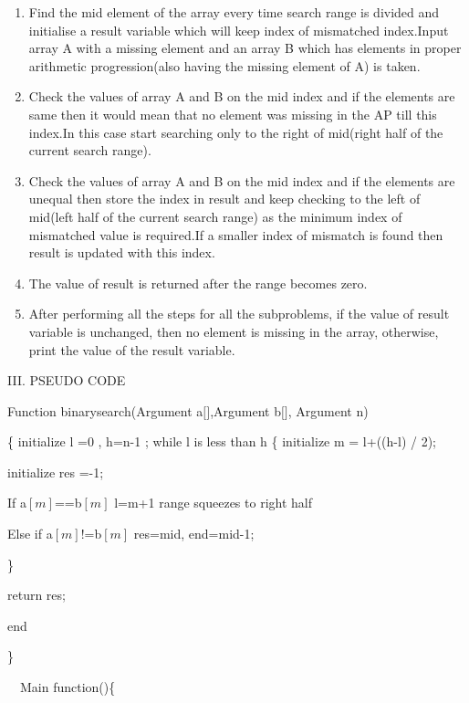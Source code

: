 \documentclass[12pt,a4paper]{article}
\begin{document}
\begin{multicols}{2}
\begin{enumerate}
\item Find the mid element of the array every time search range is divided and initialise a result variable which will keep index of mismatched index.Input array A with a missing element and an array B which has elements in proper arithmetic progression(also having the missing element of A) is taken.
\item Check the values of array A and B on the mid index and if the elements are same then it would mean that no element was missing in the AP till this index.In this case start searching only to the right of mid(right half of the current search range).
\item Check the values of array A and B on the mid index and if the elements are unequal then store the index in result and keep checking to the left of mid(left half of the current search range) as the minimum index of mismatched value is required.If a smaller index of mismatch is found then result is updated with this index.
\item The value of result is returned after the range becomes zero.
\item After performing all the steps for all the subproblems, if the value of result variable is unchanged, then no element is missing in the array, otherwise, print the value of the result variable.
\setcounter{numberedCntA}{\theenumi}
\end{enumerate}




\begin{center}III. PSEUDO CODE\end{center}


Function binarysearch(Argument a$[$$]$,Argument b$[$$]$, Argument n) 


\{ 
\quad initialize l =0 , h=n-1 ;
\quad  while l is less than h 
\{
\quad initialize m = l+((h-l) / 2);

\quad initialize res =-1;



\quad If a$[m]$==b$[m]$ l=m+1 range squeezes to right half


\quad Else if a$[m]$!=b$[m]$  res=mid, end=mid-1;


\}
 

\quad return res; 

end

\} 

\ \ Main function()\{ 


\end{multicols}
\end{document}
